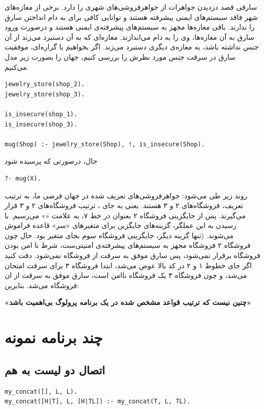 \documentclass{article}
\begin{document}
\vspace{1cm}
{\large
\noindent
سارقی قصد دزدیدن جواهرات از جواهرفروشی‌های شهری را دارد.
برخی از مغازه‌های شهر فاقد سیستم‌های ایمنی پیشرفته هستند و توانایی کافی
برای به دام انداختن سارق را ندارند.
باقی مغازه‌ها مجهز به سیستم‌های پیشرفته‌ی ایمنی هستند و درصورت ورود سارق
به آن مغازه‌ها، وی را به دام می‌اندازند.
مغازه‌ای که به آن دستبرد می‌زند از آن جنس نداشته باشد، به مغازه‌ی دیگری دستبرد می‌زند.
}
\clearpage
\noindent اگر بخواهیم با گزاره‌ای، موفقیت سارق در سرقت جنس مورد نظرش را بررسی کنیم، جهان را
بصورت زیر مدل می‌کنیم.
\begin{latin}
\begin{verbatim}
jewelry_store(shop_2).
jewelry_store(shop_3).

is_insecure(shop_1).
is_insecure(shop_3).

mug(Shop) :- jewelry_store(Shop), !, is_insecure(Shop).
\end{verbatim}
\end{latin}
حال، درصورتی که پرسیده شود
\begin{verbatim}
?- mug(X).
\end{verbatim}
روند زیر طی می‌شود:
جواهرفروشی‌های تعریف شده در جهان فرضی ما، به ترتیب تعریف، فروشگاه‌های ۲ و ۳ هستند.
یعنی به جای ، ترتیب فروشگاه‌های ۲ و ۳ قرار می‌گیرند.
پس از جایگزینی فروشگاه ۲ بعنوان  در خط ۷، به علامت «\lr{\tt !}» می‌رسیم.
با رسیدن به این عملگر، گزینه‌های جایگزین برای متغیر‌های «سر» قاعده فراموش می‌شوند.
(تنها گزینه دیگر، جایگزینی فروشگاه سوم بجای متغیر  بود.
حال چون فروشگاه ۲ فروشگاه مجهز به سیستم‌های پیشرفته‌ی امنیتی‌ست، شرط نا امن بودن
فروشگاه برقرار نمی‌شود، پس سارق موفق به سرقت از فروشگاه نمی‌شود.
\clearpage
\noindent دقت کنید اگر جای خطوط ۱ و ۲ در کد بالا عوض می‌شد، ابتدا فروشگاه ۳ برای سرقت امتحان می‌شد،
و چون فروشگاه ۳ یک فروشگاه ناامن است، سارق موفق به سرقت از ان فروشگاه می‌شد.
بنابرین:
\vspace{1.5cm}
{\begin{center} \Large \bf «چنین نیست که ترتیب قواعد مشخص شده در یک برنامه پرولوگ بی‌اهمیت باشد» \end{center}}
\clearpage
\section{چند برنامه نمونه}
\subsection{اتصال دو لیست به هم}
\begin{verbatim}
my_concat([], L, L).
my_concat([H|T], L, [H|TL]) :- my_concat(T, L, TL).
\end{verbatim}
\end{document}
